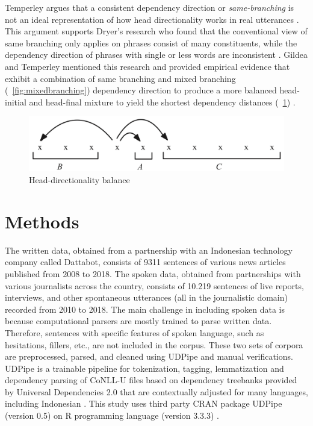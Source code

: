 \documentclass[10pt, a4paper, conference, compsocconf]{IEEEtran}
\begin{document}
Temperley argues that a consistent dependency direction or \textit{same-branching} is not an ideal representation of how head directionality works in real utterances \cite{temperley2008dependency}. This argument supports Dryer's research who found that the conventional view of same branching only applies on phrases consist of many constituents, while the dependency direction of phrases with single or less words are inconsistent \cite{dryer1992greenbergian}. Gildea and Temperley mentioned this research and provided empirical evidence that exhibit a combination of same branching and mixed branching (\pic~\ref{fig:mixedbranching}) dependency direction to produce a more balanced head-initial and head-final mixture to yield the shortest dependency distances (\pic~\ref{fig:balancedbranching}) \cite{gildea2010grammars}.

\begin{figure}
	\centering \includegraphics[width=0.45
	\textwidth] {pics/balancedbranching.png} \caption{Head-directionality balance \cite{temperley2008dependency}} 
\label{fig:balancedbranching} \end{figure}

\section{Methods}

The written data, obtained from a partnership with an Indonesian technology company called Dattabot, consists of 9311 sentences of various news articles published from 2008 to 2018. The spoken data, obtained from partnerships with various journalists across the country, consists of 10.219 sentences of live reports, interviews, and other spontaneous utterances (all in the journalistic domain) recorded from 2010 to 2018. The main challenge in including spoken data is because computational parsers are mostly trained to parse written data. Therefore, sentences with specific features of spoken language, such as hesitations, fillers, etc., are not included in the corpus. These two sets of corpora are preprocessed, parsed, and cleaned using UDPipe \cite{udpipe2017} and manual verifications. UDPipe is a trainable pipeline for tokenization, tagging, lemmatization and dependency parsing of CoNLL-U files based on dependency treebanks provided by Universal Dependencies 2.0 that are contextually adjusted for many languages, including Indonesian \cite{udpipe2017, nivre2017universal}. This study uses third party CRAN package UDPipe (version 0.5) on R programming language (version 3.3.3) \cite{udpipe2017manual, r2017project}.
\end{document}

